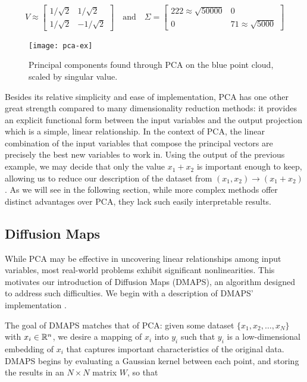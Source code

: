 \begin{align*}
  V \approx \begin{bmatrix} 1/\sqrt{2} & 1/\sqrt{2} \\
    1/\sqrt{2} & - 1/\sqrt{2} 
  \end{bmatrix} \quad \mathrm{and} \quad
                 \Sigma = \begin{bmatrix} 222 \approx \sqrt{50000} & 0 \\
                   0 & 71 \approx \sqrt{5000}
                 \end{bmatrix}
\end{align*}

\begin{figure}
  \centering
  \texttt{[image: pca-ex]}
  \caption[Example of principal component analysis]{Principal
    components found through PCA on the blue point cloud, scaled by
    singular value. \label{fig:pca-ex}}
\end{figure}

Besides its relative simplicity and ease of implementation, PCA has
one other great strength compared to many dimensionality reduction
methods: it provides an explicit functional form between the input
variables and the output projection which is a simple, linear
relationship. In the context of PCA, the linear combination of the
input variables that compose the principal vectors are precisely the
best new variables to work in. Using the output of the previous
example, we may decide that only the value $x_1 + x_2$ is important
enough to keep, allowing us to reduce our description of the dataset
from $(x_1, x_2) \rightarrow (x_1 + x_2)$. As we will see in the
following section, while more complex methods offer distinct
advantages over PCA, they lack such easily interpretable results.

\subsection{Diffusion Maps \label{sec:dmaps}}

While PCA may be effective in uncovering linear relationships among
input variables, most real-world problems exhibit significant
nonlinearities. This motivates our introduction of Diffusion Maps
(DMAPS), an algorithm designed to address such difficulties. We begin
with a description of DMAPS' implementation
\cite{nadler_diffusion_2005}.

The goal of DMAPS matches that of PCA: given some dataset
$\{x_1, x_2, \hdots, x_N \}$ with $x_i \in \mathbb{R}^n$, we desire a mapping
of $x_i$ into $y_i$ such that $y_i$ is a low-dimensional embedding of
$x_i$ that captures important characteristics of the original
data. DMAPS begins by evaluating a Gaussian kernel between each point,
and storing the results in an $N \times N$ matrix $W$, so that

